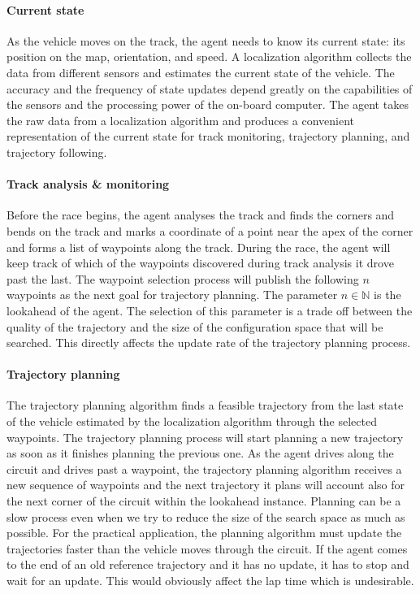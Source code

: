 \paragraph{Current state} As the vehicle moves on the track, the agent needs to know its current state: its position on the map, orientation, and speed. A localization algorithm collects the data from different sensors and estimates the current state of the vehicle. The accuracy and the frequency of state updates depend greatly on the capabilities of the sensors and the processing power of the on-board computer. The agent takes the raw data from a localization algorithm and produces a convenient representation of the current state for track monitoring, trajectory planning, and trajectory following.

\paragraph{Track analysis \& monitoring} Before the race begins, the agent analyses the track and finds the corners and bends on the track and marks a coordinate of a point near the apex of the corner and forms a list of waypoints along the track. During the race, the agent will keep track of which of the waypoints discovered during track analysis it drove past the last. The waypoint selection process will publish the following $n$ waypoints as the next goal for trajectory planning. The parameter $n\in\mathbb{N}$ is the lookahead of the agent. The selection of this parameter is a trade off between the quality of the trajectory and the size of the configuration space that will be searched. This directly affects the update rate of the trajectory planning process.

\paragraph{Trajectory planning} The trajectory planning algorithm finds a feasible trajectory from the last state of the vehicle estimated by the localization algorithm through the selected waypoints. The trajectory planning process will start planning a new trajectory as soon as it finishes planning the previous one. As the agent drives along the circuit and drives past a waypoint, the trajectory planning algorithm receives a new sequence of waypoints and the next trajectory it plans will account also for the next corner of the circuit within the lookahead instance. Planning can be a slow process even when we try to reduce the size of the search space as much as possible. For the practical application, the planning algorithm must update the trajectories faster than the vehicle moves through the circuit. If the agent comes to the end of an old reference trajectory and it has no update, it has to stop and wait for an update. This would obviously affect the lap time which is undesirable.


